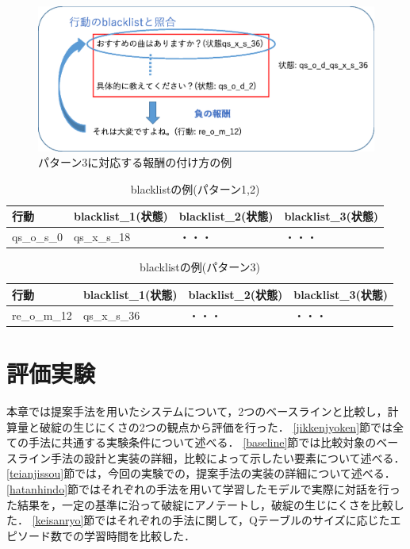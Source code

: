 \documentclass[12pt,a4paper,twoside,openany]{jbook}
\begin{document}
\begin{figure}[tb]
  \begin{center} %
    \includegraphics[width=12cm]{hosyuimage2_2.eps}
    \caption{パターン3に対応する報酬の付け方の例} %
    \label{hosyuimage2} %
  \end{center}
\end{figure}

\begin{table}[tb]
    \caption{blacklistの例(パターン1,2)}\label{blacklist1}
    \centering
    \begin{tabular}{|l|l|l|l|}\hline 
         行動&blacklist\_1(状態)&blacklist\_2(状態)&blacklist\_3(状態) \\ \hline \hline
        qs\_o\_s\_0&qs\_x\_s\_18&・・・&・・・ \\ \hline
    \end{tabular}
\end{table}

\begin{table}[tb]
    \caption{blacklistの例(パターン3)}\label{blacklist2}
    \centering
    \begin{tabular}{|l|l|l|l|}\hline 
         行動&blacklist\_1(状態)&blacklist\_2(状態)&blacklist\_3(状態) \\ \hline \hline
        re\_o\_m\_12&qs\_x\_s\_36&・・・&・・・ \\ \hline
    \end{tabular}
\end{table}


\chapter{評価実験}
本章では提案手法を用いたシステムについて，2つのベースラインと比較し，計算量と破綻の生じにくさの2つの観点から評価を行った．
\ref{jikkenjyoken}節では全ての手法に共通する実験条件について述べる．
\ref{baseline}節では比較対象のベースライン手法の設計と実装の詳細，比較によって示したい要素について述べる．
\ref{teianjissou}節では，今回の実験での，提案手法の実装の詳細について述べる．
\ref{hatanhindo}節ではそれぞれの手法を用いて学習したモデルで実際に対話を行った結果を，一定の基準に沿って破綻にアノテートし，破綻の生じにくさを比較した．
\ref{keisanryo}節ではそれぞれの手法に関して，Qテーブルのサイズに応じたエピソード数での学習時間を比較した．
\end{document}
